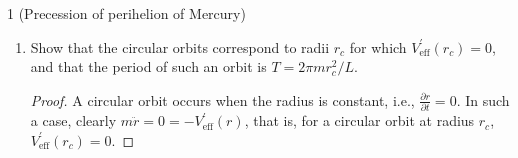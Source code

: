 \documentclass[11pt]{article}
\begin{document}
\begin{problem}{1 (Precession of perihelion of Mercury)}
\begin{enumerate}[label=(\alph*)]
\begin{answer}
			      Since \( L^2 = m^2 r^4 \dot{\phi}^2\), we can rewrite \cref{eq:momentum1} in terms of L as
			      \begin{align}
				      \nonumber m \ddot{r}        & = \frac{L^2}{m r^3} - V^{\prime}(r)                                                        \\
				      \label{eq:angmom} & = \frac{\mathrm{d} }{\mathrm{d} r} \left( \frac{L^2}{m}(- \frac{1}{2 r^2}) - V(r) \right).
			      \end{align}
			      Therefore, if we define \( V_{\text{eff}}(r) \coloneq \frac{L^2}{2m r^2} + V(r) \), \cref{eq:angmom} reads
			      \begin{equation}
				      \label{eq:24}
				      m \ddot{r} = -V_{\text{eff}}^{\prime}(r).
			      \end{equation}
		      \end{answer}
		\item Show that the circular orbits correspond to radii \( r_c \) for which \( V_{\text{eff}}^{\prime}(r_c) = 0 \), and that the period of such an orbit is \( T = 2\pi mr_c^2 / L \).
		      \begin{proof}
			      A circular orbit occurs when the radius is constant, i.e., \( \frac{\partial r}{\partial t} = 0 \).
			      In such a case, clearly \( m \ddot{r} = 0 = -V_{\text{eff}}^{\prime}(r) \), that is, for a circular orbit at  radius \( r_c \), \( V^{\prime}_{\text{eff}}(r_c) = 0 \).


\end{proof}
\end{enumerate}
\end{problem}
\end{document}
